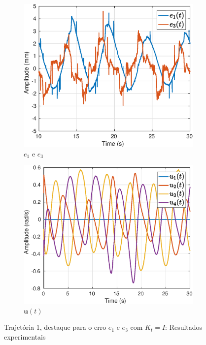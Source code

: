 \begin{figure}[H]
\centering
\begin{subfigure}{.5\textwidth}
  \centering
  \includegraphics[width=\linewidth]{./img/traj_1_k1/error.eps}
  \caption{$e_1$ e $e_3$}
  \label{fig:sub1}
\end{subfigure}%
\begin{subfigure}{.5\textwidth}
  \centering
  \includegraphics[width=\linewidth]{./img/traj_1_k1/u.eps}
  \caption{$\bm{u}(t)$}
  \label{fig:sub2}
\end{subfigure}
\caption{Trajetória 1, destaque para o erro $e_1$ e $e_3$ com ${K}_t = {I}$: Resultados experimentais}
\label{fig:erro_traj}
\end{figure}

